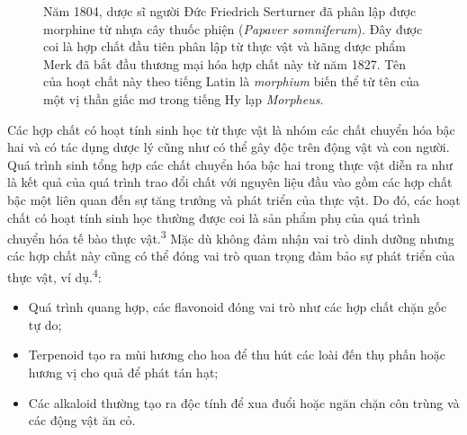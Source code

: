 \documentclass[
  letterpaper,
  DIV=11,
  numbers=noendperiod]{scrartcl}
\begin{document}
\begin{figure}
\begin{minipage}{0.50\linewidth}
{}


\end{minipage}%

\caption{\label{fig-morphine}Năm 1804, dược sĩ người Đức Friedrich
Serturner đã phân lập được morphine từ nhựa cây thuốc phiện
(\emph{Papaver somniferum}). Đây được coi là hợp chất đầu tiên phân lập
từ thực vật và hãng dược phẩm Merk đã bắt đầu thương mại hóa hợp chất
này từ năm 1827. Tên của hoạt chất này theo tiếng Latin là
\emph{morphium} biến thể từ tên của một vị thần giấc mơ trong tiếng Hy
lạp \emph{Morpheus}.}

\end{figure}%

Các hợp chất có hoạt tính sinh học từ thực vật là nhóm các chất chuyển
hóa bậc hai và có tác dụng dược lý cũng như có thể gây độc trên động vật
và con người. Quá trình sinh tổng hợp các chất chuyển hóa bậc hai trong
thực vật diễn ra như là kết quả của quá trình trao đổi chất với nguyên
liệu đầu vào gồm các hợp chất bậc một liên quan đến sự tăng trưởng và
phát triển của thực vật. Do đó, các hoạt chất có hoạt tính sinh học
thường được coi là sản phẩm phụ của quá trình chuyển hóa tế bào thực
vật.\textsuperscript{3} Mặc dù không đảm nhận vai trò dinh dưỡng nhưng
các hợp chất này cũng có thể đóng vai trò quan trọng đảm bảo sự phát
triển của thực vật, ví dụ.\textsuperscript{4}:

\begin{itemize}
\item
  Quá trình quang hợp, các flavonoid đóng vai trò như các hợp chất chặn
  gốc tự do;
\item
  Terpenoid tạo ra mùi hương cho hoa để thu hút các loài đến thụ phấn
  hoặc hương vị cho quả để phát tán hạt;
\item
  Các alkaloid thường tạo ra độc tính để xua đuổi hoặc ngăn chặn côn
  trùng và các động vật ăn cỏ.
\end{itemize}
\end{document}
